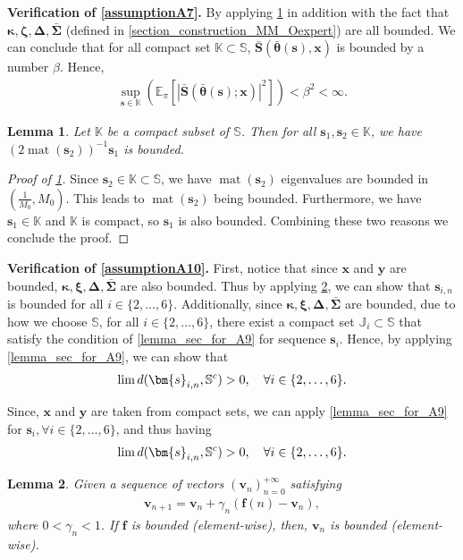 \documentclass{article}
\DeclareMathOperator*{\mat}{mat}
\let\inf\relax
\DeclareMathOperator*\inf{\vphantom{p}inf}
\newtheorem{lemma}{Lemma}
\def\PE{\mathbb{E}_\pi} %
\def\param{\vtheta}
\def\barparam{\bar{\param}}
\def\Kset{\mathbb{K}}
\def\bars{\bar{\vS}}
\def\rvx{{\mathbf{x}}}
\def\vxi{{\bm{\xi}}}
\def\vkappa{{\bm{\kappa}}}
\def\vzeta{{\bm{\zeta}}}
\def\vSigma{{\bm{\Sigma}}}
\def\vtheta{{\bm{\theta}}}
\def\vf{{\bm{f}}}
\def\vs{{\bm{s}}}
\def\vS{{\bm{S}}}
\def\vv{{\bm{v}}}
\def\vx{{\bm{x}}}
\def\vy{{\bm{y}}}
\def\mDelta{{\bm{\Delta}}}
\begin{document}
\textbf{Verification of \cref{assumptionA7}.}  By applying \cref{lemma_assump_A7} in addition with the fact that $\vkappa, \vzeta,\mDelta,\bar{\vSigma}$ (defined in \cref{section_construction_MM_Oexpert}) are all bounded. We can conclude that for all compact set $\mathbb{K}\subset\mathbb{S}$, $\bars(\bar{\vtheta}(\vs),\vx)$ is bounded by a number $\beta$. Hence,
\begin{align*}
    \sup_{\vs \in \Kset}(\PE\left[ |\bars\left(\barparam(\vs);\rvx\right)|^2\right]) < \beta^2 <\infty.
\end{align*}
\begin{lemma} \label{lemma_assump_A7}
    Let $\mathbb{K}$ be a compact subset of $\mathbb{S}$. Then for all $\vs_1,\vs_2\in \mathbb{K}$, we have $(2\mat(\vs_2))^{-1}\vs_1$ is bounded.
\end{lemma}
\begin{proof}[Proof of \cref{lemma_assump_A7}]
    Since $\vs_2\in\mathbb{K}\subset\mathbb{S}$, we have $\mat(\vs_2)$ eigenvalues are bounded in $\left(\frac{1}{M_0},M_0\right)$. This leads to $\mat(\vs_2)$ being bounded. Furthermore, we have $\vs_1\in\mathbb{K}$ and $\mathbb{K}$ is compact, so $\vs_1$ is also bounded. Combining these two reasons we conclude the proof.
\end{proof}


\textbf{Verification of \cref{assumptionA10}.} First, notice that since $\vx$ and $\vy$ are bounded, $\vkappa,\vxi,\mDelta,\bar{\vSigma}$ are also bounded. Thus by applying \cref{lemma_fir_for_A9}, we can show that $\vs_{i,n}$ is bounded for all $i\in\{2,\dots,6\}$. Additionally, since $\vkappa,\vxi,\mDelta,\bar{\vSigma}$ are bounded, due to how we choose $\mathbb{S}$, for all $i\in\{2,\dots,6\}$, there exist a compact set $\mathbb{J}_i\subset\mathbb{S}$ that satisfy the condition of \cref{lemma_sec_for_A9} for sequence $\vs_i$. Hence, by applying \cref{lemma_sec_for_A9}, we can show that 
    \begin{align*}
        \lim\inf d(\vs_{i,n},\mathbb{S}^c)>0,\quad \forall i \in \{2,\dots,6\}.
    \end{align*}
    \par Since, $\vx$ and $\vy$ are taken from compact sets, we can apply \cref{lemma_sec_for_A9} for $\vs_i, \forall i\in\{2,\dots,6\}$, and thus having
    \begin{align*}
        \lim\inf d(\vs_{i,n},\mathbb{S}^c)>0,\quad \forall i \in \{2,\dots,6\}.
    \end{align*}
\begin{lemma}\label{lemma_fir_for_A9}
    Given a sequence of vectors $(\vv_n)^{+\infty}_{n=0}$ satisfying
    \begin{align*}
        \vv_{n+1}=\vv_n+\gamma_n(\vf(n)-\vv_n),
    \end{align*}
    where $0<\gamma_n<1$. If $\vf$ is bounded (element-wise), then, $\vv_n$ is bounded (element-wise). 
\end{lemma}
    
\end{document}
